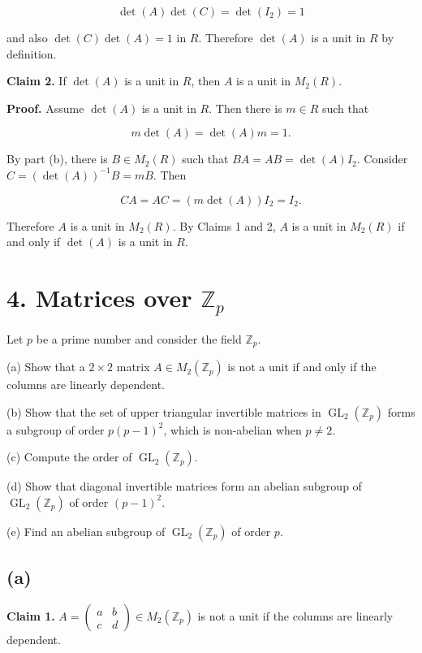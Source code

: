\[\det(A)\det(C) = \det\left( I_{2} \right) = 1\]

and also \(\det(C)\det(A) = 1\) in \(R\). Therefore \(\det(A)\) is a unit in \(R\) by definition.

\textbf{Claim 2.} If \(\det(A)\) is a unit in \(R\), then \(A\) is a unit in \(M_{2}(R)\).

\textbf{Proof.} Assume \(\det(A)\) is a unit in \(R\). Then there is \(m \in R\) such that

\[m\det(A) = \det(A)m = 1.\]

By part (b), there is \(B \in M_{2}(R)\) such that \(BA = AB = \det(A)I_{2}\). Consider \(C = \left( {\det(A)} \right)^{- 1}B = mB\). Then

\[CA = AC = \left( {m\det(A)} \right)I_{2} = I_{2}.\]

Therefore \(A\) is a unit in \(M_{2}(R)\). By Claims 1 and 2, \(A\) is a unit in \(M_{2}(R)\) if and only if \(\det(A)\) is a unit in \(R\).

\section{\texorpdfstring{4. Matrices over \(\mathbb{Z}_{p}\)}{4. Matrices over \textbackslash mathbb\{Z\}\_\{p\}}}

Let \(p\) be a prime number and consider the field \(\mathbb{Z}_{p}\).

(a) Show that a \(2 \times 2\) matrix \(A \in M_{2}\left( \mathbb{Z}_{p} \right)\) is not a unit if and only if the columns are linearly dependent.

(b) Show that the set of upper triangular invertible matrices in \(\operatorname{GL}_{2}\left( \mathbb{Z}_{p} \right)\) forms a subgroup of order \({p\left( {p - 1} \right)}^{2}\), which is non-abelian when \(p \neq 2\).

(c) Compute the order of \(\operatorname{GL}_{2}\left( \mathbb{Z}_{p} \right)\).

(d) Show that diagonal invertible matrices form an abelian subgroup of \(\operatorname{GL}_{2}\left( \mathbb{Z}_{p} \right)\) of order \(\left( {p - 1} \right)^{2}\).

(e) Find an abelian subgroup of \(\operatorname{GL}_{2}\left( \mathbb{Z}_{p} \right)\) of order \(p\).

\subsection{(a)}

\textbf{Claim 1.} \(A = \begin{pmatrix}
a & b \\
c & d
\end{pmatrix} \in M_{2}\left( \mathbb{Z}_{p} \right)\) is not a unit if the columns are linearly dependent.


